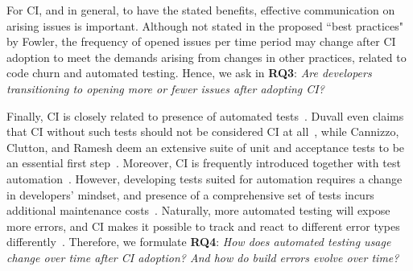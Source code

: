 For CI, and \DO in general, to have the stated benefits, effective communication on arising issues is important.
Although not stated in the proposed ``best practices" by Fowler, the frequency 
of opened issues per time period may change after CI adoption to meet the 
demands arising from changes in other practices, \eg related to code churn 
and automated testing.
Hence, we ask in \textbf{RQ3}: 
\emph{Are developers transitioning to opening more or fewer issues after 
adopting CI?}

Finally, CI is closely related to presence of automated tests~\cite{Fowler}. 
Duvall even claims that CI without such tests should not be considered CI 
at all~\cite{Duvall}, while Cannizzo, Clutton, and Ramesh deem an extensive 
suite of unit and acceptance tests to be an essential first step~\cite{CannizzoCluttonRamesh}. 
Moreover, CI is frequently introduced together with test automation~\cite{Yuksel}.
However, developing tests suited for automation requires a change in developers' 
mindset, and presence of a comprehensive set of tests incurs additional maintenance 
costs~\cite{CoramBohner}.
Naturally, more automated testing will expose more errors, and CI makes it possible 
to track and react to different error types differently~\cite{BellerGZ16}.
Therefore, we formulate \textbf{RQ4}: 
\emph{How does automated testing usage change over time after CI adoption? 
And how do build errors evolve over time?}

